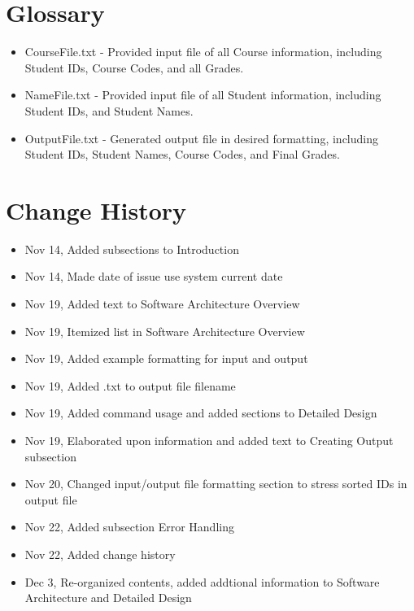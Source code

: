 \documentclass{article}
\begin{document}
\section{Glossary}
\begin{itemize}
\item CourseFile.txt - Provided input file of all Course information, including Student IDs, Course Codes, and all Grades.
\item NameFile.txt - Provided input file of all Student information, including Student IDs, and Student Names.
\item OutputFile.txt - Generated output file in desired formatting, including Student IDs, Student Names, Course Codes, and Final Grades.
\end{itemize}

\section{Change History}
\begin{itemize}
\item Nov 14, Added subsections to Introduction
\item Nov 14, Made date of issue use system current date
\item Nov 19, Added text to Software Architecture Overview
\item Nov 19, Itemized list in Software Architecture Overview
\item Nov 19, Added example formatting for input and output
\item Nov 19, Added .txt to output file filename
\item Nov 19, Added command usage and added sections to Detailed Design
\item Nov 19, Elaborated upon information and added text to Creating Output subsection
\item Nov 20, Changed input/output file formatting section to stress sorted IDs in output file
\item Nov 22, Added subsection Error Handling
\item Nov 22, Added change history
\item Dec 3, Re-organized contents, added addtional information to Software Architecture and Detailed Design
\end{itemize}
\end{document}
